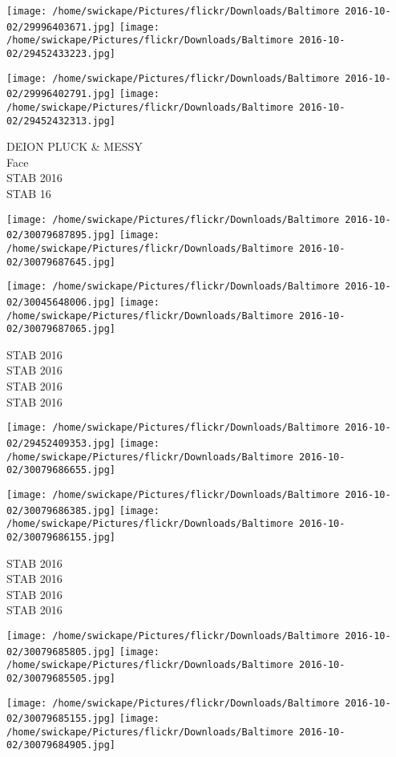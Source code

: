 \documentclass[10pt,letterpaper]{article}
\begin{document}
\texttt{[image: /home/swickape/Pictures/flickr/Downloads/Baltimore 2016-10-02/29996403671.jpg]}
\texttt{[image: /home/swickape/Pictures/flickr/Downloads/Baltimore 2016-10-02/29452433223.jpg]}

\texttt{[image: /home/swickape/Pictures/flickr/Downloads/Baltimore 2016-10-02/29996402791.jpg]}
\texttt{[image: /home/swickape/Pictures/flickr/Downloads/Baltimore 2016-10-02/29452432313.jpg]}

DEION PLUCK \& MESSY\\
Face\\
STAB 2016\\
STAB 16
\pagebreak

\texttt{[image: /home/swickape/Pictures/flickr/Downloads/Baltimore 2016-10-02/30079687895.jpg]}
\texttt{[image: /home/swickape/Pictures/flickr/Downloads/Baltimore 2016-10-02/30079687645.jpg]}

\texttt{[image: /home/swickape/Pictures/flickr/Downloads/Baltimore 2016-10-02/30045648006.jpg]}
\texttt{[image: /home/swickape/Pictures/flickr/Downloads/Baltimore 2016-10-02/30079687065.jpg]}

STAB 2016\\
STAB 2016\\
STAB 2016\\
STAB 2016
\pagebreak

\texttt{[image: /home/swickape/Pictures/flickr/Downloads/Baltimore 2016-10-02/29452409353.jpg]}
\texttt{[image: /home/swickape/Pictures/flickr/Downloads/Baltimore 2016-10-02/30079686655.jpg]}

\texttt{[image: /home/swickape/Pictures/flickr/Downloads/Baltimore 2016-10-02/30079686385.jpg]}
\texttt{[image: /home/swickape/Pictures/flickr/Downloads/Baltimore 2016-10-02/30079686155.jpg]}

STAB 2016\\
STAB 2016\\
STAB 2016\\
STAB 2016
\pagebreak

\texttt{[image: /home/swickape/Pictures/flickr/Downloads/Baltimore 2016-10-02/30079685805.jpg]}
\texttt{[image: /home/swickape/Pictures/flickr/Downloads/Baltimore 2016-10-02/30079685505.jpg]}

\texttt{[image: /home/swickape/Pictures/flickr/Downloads/Baltimore 2016-10-02/30079685155.jpg]}
\texttt{[image: /home/swickape/Pictures/flickr/Downloads/Baltimore 2016-10-02/30079684905.jpg]}
\end{document}
